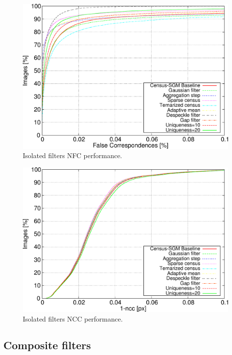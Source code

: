 \begin{figure}[h]
  \centering
  \includegraphics[width=\textwidth, trim=0 0 0 0,clip]{filt_nfc_perc}
  \caption{ Isolated filters NFC performance.}
  \label{fig:cp03_isolated_NFC}
\end{figure}%

\begin{figure}[h]
  \centering
  \includegraphics[width=\textwidth, trim=0 0 0 0,clip]{filt_ncc}
  \caption{ Isolated filters NCC performance.}
  \label{fig:cp03_isolated_NCC}
\end{figure}%

\subsection{Composite filters}\label{ch:chapter03_04_02}

